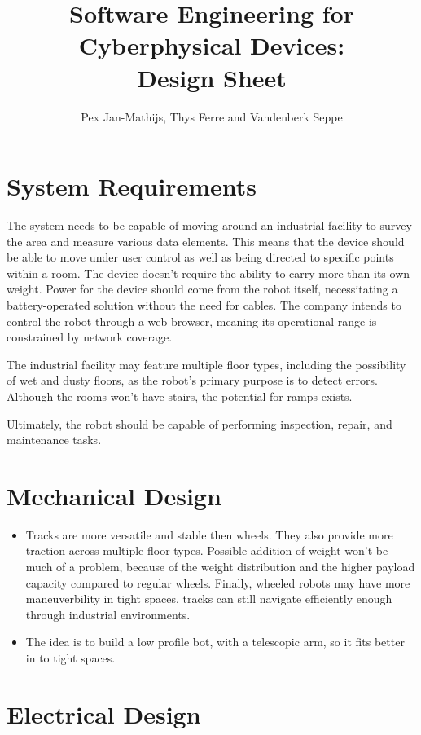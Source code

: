 \documentclass[a4paper]{article}
\title{Software Engineering for Cyberphysical Devices: \\ Design Sheet}
\author{Pex Jan-Mathijs, Thys Ferre and Vandenberk Seppe}
\date{}
\begin{document}
\maketitle

\section*{System Requirements}

The system needs to be capable of moving around an industrial facility to survey the area and measure various data elements. This means that the device should be able to move under user control as well as being directed to specific points within a room. The device doesn't require the ability to carry more than its own weight. Power for the device should come from the robot itself, necessitating a battery-operated solution without the need for cables. The company intends to control the robot through a web browser, meaning its operational range is constrained by network coverage.

The industrial facility may feature multiple floor types, including the possibility of wet and dusty floors, as the robot's primary purpose is to detect errors. Although the rooms won't have stairs, the potential for ramps exists.

Ultimately, the robot should be capable of performing inspection, repair, and maintenance tasks.

\section*{Mechanical Design}

\begin{itemize}
\item Tracks are more versatile and stable then wheels. They also provide more traction across multiple floor types. Possible addition of weight won't be much of a problem, because of the weight distribution and the higher payload capacity compared to regular wheels. Finally, wheeled robots may have more maneuverbility in tight spaces, tracks can still navigate efficiently enough through industrial environments.
\item The idea is to build a low profile bot, with a telescopic arm, so it fits better in to tight spaces.
\end{itemize}

\section*{Electrical Design}
\end{document}
